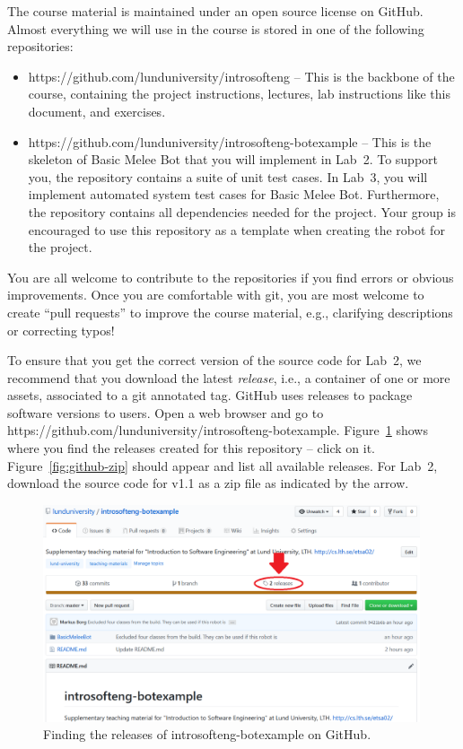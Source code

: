 \documentclass{scrreprt}
\begin{document}
The course material is maintained under an open source license on GitHub. Almost everything we will use in the course is stored in one of the following repositories:
\begin{itemize}
\item https://github.com/lunduniversity/introsofteng -- This is the backbone of the course, containing the project instructions, lectures, lab instructions like this document, and exercises.
\item https://github.com/lunduniversity/introsofteng-botexample -- This is the skeleton of Basic Melee Bot that you will implement in Lab~2. To support you, the repository contains a suite of unit test cases. In Lab~3, you will implement automated system test cases for Basic Melee Bot. Furthermore, the repository contains all dependencies needed for the project. Your group is encouraged to use this repository as a template when creating the robot for the project.
\end{itemize}

You are all welcome to contribute to the repositories if you find errors or obvious improvements. Once you are comfortable with git, you are most welcome to create ``pull requests'' to improve the course material, e.g., clarifying descriptions or correcting typos!

To ensure that you get the correct version of the source code for Lab~2, we recommend that you download the latest \textit{release}, i.e., a container of one or more assets, associated to a git annotated tag. GitHub uses releases to package software versions to users. Open a web browser and go to https://github.com/lunduniversity/introsofteng-botexample. Figure~\ref{fig:github-release} shows where you find the releases created for this repository -- click on it. Figure~\ref{fig:github-zip} should appear and list all available releases. For Lab~2, download the source code for v1.1 as a zip file as indicated by the arrow.

\begin{figure}
\centering
\includegraphics[width=0.99\textwidth]{figures/GitHub-release.png}
\caption{Finding the releases of introsofteng-botexample on GitHub.}
\label{fig:github-release}
\end{figure}
\end{document}
